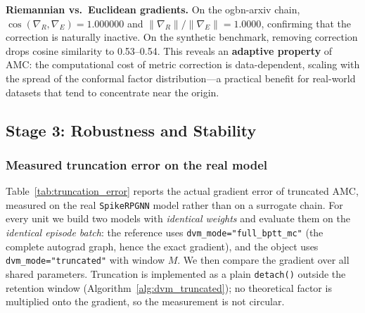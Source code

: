 \documentclass[a4paper,fleqn]{cas-dc}
\begin{document}
\textbf{Riemannian vs.\ Euclidean gradients.} On the ogbn-arxiv chain, $\cos(\nabla_R, \nabla_E) = 1.000000$ and $\|\nabla_R\|/\|\nabla_E\| = 1.0000$, confirming that the correction is naturally inactive. On the synthetic benchmark, removing correction drops cosine similarity to 0.53--0.54. This reveals an \textbf{adaptive property} of AMC: the computational cost of metric correction is data-dependent, scaling with the spread of the conformal factor distribution---a practical benefit for real-world datasets that tend to concentrate near the origin.

\subsection{Stage 3: Robustness and Stability}
\label{sec:robustness}

\subsubsection{Measured truncation error on the real model}

Table~\ref{tab:truncation_error} reports the actual gradient error of truncated AMC, measured on the real \texttt{SpikeRPGNN} model rather than on a surrogate chain. For every unit we build two models with \emph{identical weights} and evaluate them on the \emph{identical episode batch}: the reference uses \texttt{dvm\_mode="full\_bptt\_mc"} (the complete autograd graph, hence the exact gradient), and the object uses \texttt{dvm\_mode="truncated"} with window $M$. We then compare the gradient over all shared parameters. Truncation is implemented as a plain \texttt{detach()} outside the retention window (Algorithm~\ref{alg:dvm_truncated}); no theoretical factor is multiplied onto the gradient, so the measurement is not circular.

\begin{table}[htbp]
\caption{Measured gradient error of truncated AMC against full BPTT on the real SpikeRPGNN model ($T{=}16$, identical weights and batch; mean$\pm$std over seeds).}
\label{tab:truncation_error}
\centering\footnotesize
{}
\end{table}
\end{document}
